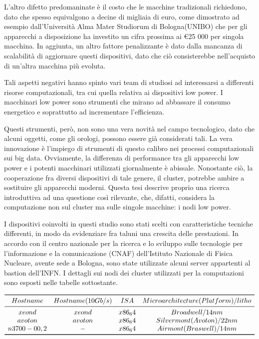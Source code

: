 L'altro difetto predomaninate è il costo che le macchine tradizionali richiedono, dato che spesso equivalgono a decine di migliaia di euro, come dimostrato ad esempio dall'Università Alma Mater Studiorum di Bologna(UNIBO) che per gli apparecchi a disposizione ha investito un cifra prossima ai \euro 25 000 per singola macchina.
In aggiunta, un altro fattore penalizzante è dato dalla mancanza di scalabilità di aggiornare questi dispositivi, dato che ciò consisterebbe nell'acquisto di un'altra macchina più evoluta.

Tali aspetti negativi hanno spinto vari team di studiosi ad interessarsi a differenti risorse computazionali, tra cui quella relativa ai dispositivi low power.
I macchinari low power sono strumenti che mirano ad abbassare il consumo energetico e soprattutto ad incrementare l'efficienza.

Questi strumenti, però, non sono una vera novità nel campo tecnologico, dato che alcuni oggetti, come gli orologi, possono essere già considerati tali.
La vera innovazione è l'impiego di strumenti di questo calibro nei processi computazionali sui big data.
Ovviamente, la differenza di performance tra gli apparecchi low power e i potenti macchinari utilizzati giornalmente è abissale.
Nonostante ciò, la cooperazione fra diversi dispositivi di tale genere, il cluster, potrebbe ambire a sostituire gli apparecchi moderni.
Questa tesi descrive proprio una ricerca introduttiva ad una questione così rilevante, che, difatti, considera la computazione non sul cluster ma sulle singole macchine: i nodi low power.

I dispositivi coinvolti in questi studio sono stati scelti con caratteristiche tecniche differenti, in modo da evidenziare fra taluni una crescita delle prestazioni.
In accordo con il centro nazionale per la ricerca e lo sviluppo sulle tecnologie per l'informazione e la comunicazione (CNAF) dell'Istituto Nazionale di Fisica Nucleare, avente sede a Bologna, sono state utilizzate alcuni server appartenti al bastion dell'INFN.
I dettagli sui nodi dei cluster utilizzati per la computazioni sono esposti nelle tabelle sottostante.
\begin{table}
\centering
$\begin{array}{*{4}{c}}
	\toprule
		Hostname & Hostname(10Gb/s) & ISA & Microarchitecture(Platform)/litho \\
	\midrule
		xeond & xeond & x86_64 & Broadwell/14nm \\
		avoton & avoton & x86_64 & Silvermont(Avoton)/22nm \\
		n3700-0{0,2} & - & x86_64 & Airmont(Braswell)/14nm \\
	\bottomrule
\end{array}$
\caption{}
\label{tab:1}
\end{table}

